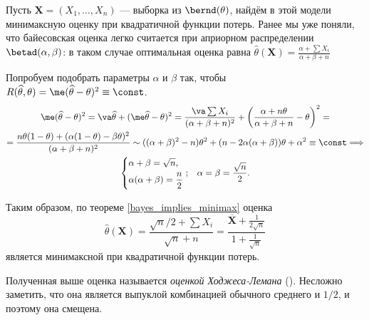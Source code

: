 \begin{example}
	Пусть $\mathbf{X} = (X_1, \ldots, X_n)$ --- выборка из $\bernd(\theta)$, найдём в этой модели минимаксную оценку при квадратичной функции потерь. Ранее мы уже поняли, что байесовская оценка легко считается при априорном распределении $\betad(\alpha, \beta)$: в таком случае оптимальная оценка равна
	$\widehat{\theta}(\mathbf X) = \frac{\alpha + \sum X_i}{\alpha + \beta + n}$
	
	Попробуем подобрать параметры $\alpha$ и $\beta$ так, чтобы $R(\widehat\theta, \theta) = \me (\widehat\theta - \theta)^2 \equiv \const$.
	\begin{gather*}
		\me (\widehat\theta - \theta)^2 = \va \widehat\theta + (\me \widehat\theta - \theta)^2 = \frac{\va \sum X_i}{(\alpha + \beta + n)^2} + \left(\frac{\alpha + n\theta}{\alpha + \beta + n} - \theta\right)^2 = \\
		= \frac{n\theta(1-\theta) + (\alpha(1-\theta) - \beta \theta)^2}{(\alpha + \beta + n)^2} \sim ((\alpha+\beta)^2-n)\theta^2 + (n - 2\alpha(\alpha+\beta))\theta + \alpha^2 \equiv \const \Longrightarrow \\
		\left\{\begin{aligned}
			&\alpha+\beta = \sqrt{n},\\
			&\alpha(\alpha+\beta) = \frac{n}{2}
		\end{aligned}\right. ; \;\;\;
		\alpha = \beta = \frac{\sqrt{n}}{2}.
	\end{gather*}
	
	Таким образом, по теореме \ref{bayes_implies_minimax} оценка
	\[
	\widehat{\theta}(\mathbf X) = \frac{\sqrt{n} / 2 + \sum X_i}{\sqrt{n} + n} = \frac{\overline{\mathbf X} + \frac{1}{2\sqrt{n}}}{1 + \frac{1}{\sqrt{n}}}
	\]
	является минимаксной при квадратичной функции потерь.
\end{example}

Полученная выше оценка называется \textit{оценкой Ходжеса-Лемана} (\cite{hodges1950some}). Несложно заметить, что она является выпуклой комбинацией обычного среднего и $1/2$, и поэтому она смещена.




